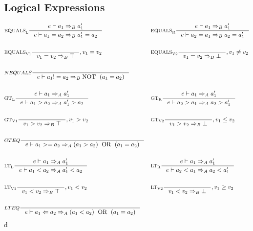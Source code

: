 \subsection{Logical Expressions}
\begin{align*}
&\inference[$\text{EQUALS}_\text{L}$]{e \vdash a_1 \Rightarrow_B a_1'}
                    {e \vdash a_1 = a_2 \Rightarrow_B a_1' = a_2}
&
&\inference[$\text{EQUALS}_\text{R}$]{e \vdash a_1 \Rightarrow_B a_1'}
                    {e \vdash a_2 = a_1 \Rightarrow_B a_2 = a_1'}
\\\\
&\inference[$\text{EQUALS}_\text{V1}$]{}
                    {v_1 = v_2 \Rightarrow_B \top}
										{, v_1 = v_2}
&
&\inference[$\text{EQUALS}_\text{V2}$]{}
                    {v_1 = v_2 \Rightarrow_B \bot}
										{, v_1 \neq v_2}
\\\\
&\inference[$NEQUALS$]{}
                    {e \vdash a_1 != a_2 \Rightarrow_B \Tnot (a_1 = a_2)}
\\\\
&\inference[$\text{GT}_\text{L}$]{e \vdash a_1 \Rightarrow_A a_1'}
                    {e \vdash a_1 > a_2 \Rightarrow_A a_1' > a_2}
&
&\inference[$\text{GT}_\text{R}$]{e \vdash a_1 \Rightarrow_A a_1'}
                    {e \vdash a_2 > a_1 \Rightarrow_A a_2 > a_1'}
\\\\
&\inference[$\text{GT}_\text{V1}$]{}
                    {v_1 > v_2 \Rightarrow_B \top}
										{, v_1 > v_2}
&
&\inference[$\text{GT}_\text{V2}$]{}
                    {v_1 > v_2 \Rightarrow_B \bot}
										{, v_1 \leq v_2}
\\\\
&\inference[$GTEQ$]{}
                    {e \vdash a_1 >= a_2 \Rightarrow_A (a_1 > a_2) \Tor (a_1 = a_2)}
\\\\
&\inference[$\text{LT}_\text{L}$]{e \vdash a_1 \Rightarrow_A a_1'}
                    {e \vdash a_1 < a_2 \Rightarrow_A a_1' < a_2}
&
&\inference[$\text{LT}_\text{R}$]{e \vdash a_1 \Rightarrow_A a_1'}
                    {e \vdash a_2 < a_1 \Rightarrow_A a_2 < a_1'}
\\\\
&\inference[$\text{LT}_\text{V1}$]{}
                    {v_1 < v_2 \Rightarrow_B \top}
										{, v_1 < v_2}
&
&\inference[$\text{LT}_\text{V2}$]{}
                    {v_1 < v_2 \Rightarrow_B \bot}
										{, v_1 \geq v_2}
\\\\
&\inference[$LTEQ$]{}
                    {e \vdash a_1 <= a_2 \Rightarrow_A (a_1 < a_2) \Tor (a_1 = a_2)}
\end{align*}
d
